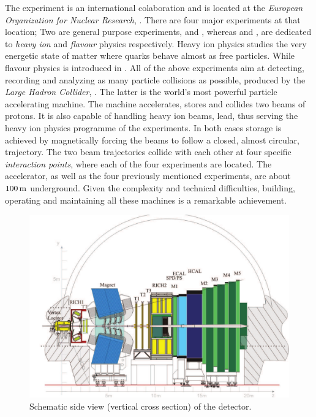 
The \lhcb experiment is an international colaboration and is located at the {\it European Organization for Nuclear Research}, \cern.
There are four major experiments at that location; Two are general purpose experiments, \atlas and \cms, whereas
\alice and \lhcb, are dedicated to {\it heavy ion} and {\it flavour} physics respectively. Heavy ion physics
studies the very energetic state of matter where quarks behave almost as free particles.
While flavour physics is introduced in . All of the above experiments aim at detecting,
recording and analyzing as many particle collisions as possible, produced by the {\it Large Hadron Collider}, \lhc.
The latter is the world's most powerful particle accelerating machine.
The \lhc machine accelerates, stores and collides two beams of protons. It is also capable of handling
heavy ion beams, \eg lead, thus serving the heavy ion physics programme of the experiments.
In both cases storage is achieved by magnetically forcing the beams to follow a closed, almost circular,
trajectory. The two beam trajectories collide with each other at four specific {\it interaction points},
where each of the four experiments are located. The \lhc accelerator, as well as the four previously
mentioned experiments, are about $100\rm \,m$ underground. Given the complexity and technical difficulties,
building, operating and maintaining all these machines is a remarkable achievement.

\begin{figure}[t]
  \centering
  \includegraphics[width=1\textwidth]{Figures/Chapter2/detector_cross_cmyk}
  \caption{Schematic side view (vertical cross section) of the \lhcb detector.}
  \label{lhcb_detector_cross_section}
\end{figure}

